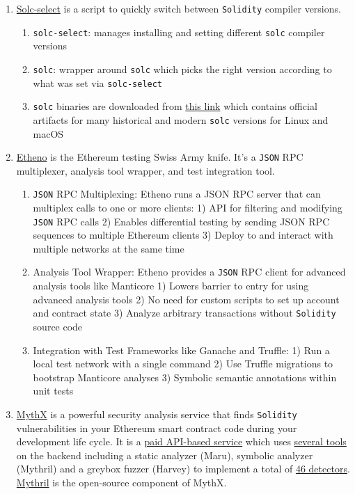 \begin{enumerate}
\item\href{https://github.com/crytic/solc-select}{Solc-select} is a script to quickly switch between \verb|Solidity| compiler versions.
	\begin{enumerate}
	\item\verb|solc-select|: manages installing and setting different \verb|solc| compiler versions
	\item\verb|solc|: wrapper around \verb|solc| which picks the right version according to what was set via \verb|solc-select|
	\item\verb|solc| binaries are downloaded from \href{https://binaries.soliditylang.org/}{this link} which contains official artifacts for many historical and modern \verb|solc| versions for Linux and macOS
	\end{enumerate}

\item\href{https://github.com/crytic/etheno}{Etheno} is the Ethereum testing Swiss Army knife. It’s a \verb|JSON| RPC multiplexer, analysis tool wrapper, and test integration tool.
	\begin{enumerate}
	\item\verb|JSON| RPC Multiplexing: Etheno runs a JSON RPC server that can multiplex calls to one or more clients: 1) API for filtering and modifying \verb|JSON| RPC calls 2) Enables differential testing by sending JSON RPC sequences to multiple Ethereum clients 3) Deploy to and interact with multiple networks at the same time
	\item Analysis Tool Wrapper: Etheno provides a \verb|JSON| RPC client for advanced analysis tools like Manticore 1) Lowers barrier to entry for using advanced analysis tools 2) No need for custom scripts to set up account and contract state 3) Analyze arbitrary transactions without \verb|Solidity| source code
	\item Integration with Test Frameworks like Ganache and Truffle: 1) Run a local test network with a single command 2) Use Truffle migrations to bootstrap Manticore analyses 3) Symbolic semantic annotations within unit tests
	\end{enumerate}

\item\href{https://mythx.io/}{MythX} is a powerful security analysis service that finds \verb|Solidity| vulnerabilities in your Ethereum smart contract code during your development life cycle. It is a \href{https://mythx.io/plans/}{paid API-based service} which uses \href{https://mythx.io/tools/}{several tools} on the backend including a static analyzer (Maru), symbolic analyzer (Mythril) and a greybox fuzzer (Harvey) to implement a total of \href{https://mythx.io/detectors/}{46 detectors}. \href{https://github.com/ConsenSys/mythril}{Mythril} is the open-source component of MythX.


\end{enumerate}
